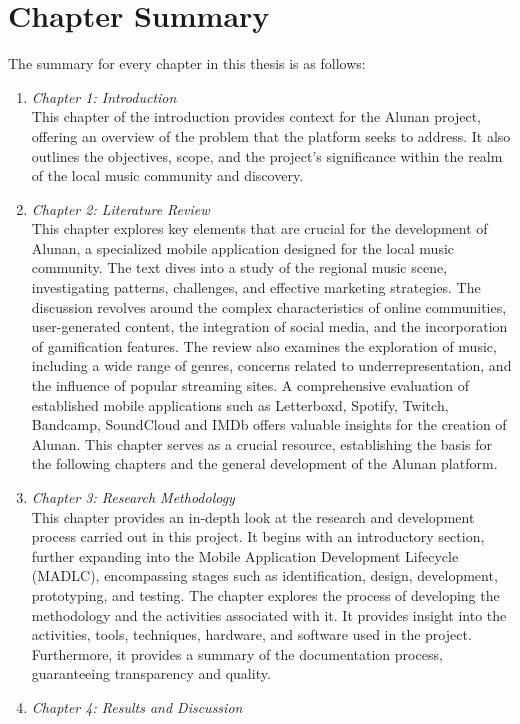 \section{Chapter Summary}
The summary for every chapter in this thesis is as follows:
\begin{enumerate}[1.]
    \item \textit{Chapter 1: Introduction} \\
    This chapter of the introduction provides context for the Alunan project, offering an overview of the problem that the platform seeks to address. It also outlines the objectives, scope, and the project's significance within the realm of the local music community and discovery.
    \item \textit{Chapter 2: Literature Review} \\
    This chapter explores key elements that are crucial for the development of Alunan, a specialized mobile application designed for the local music community. The text dives into a study of the regional music scene, investigating patterns, challenges, and effective marketing strategies. The discussion revolves around the complex characteristics of online communities, user-generated content, the integration of social media, and the incorporation of gamification features. The review also examines the exploration of music, including a wide range of genres, concerns related to underrepresentation, and the influence of popular streaming sites. A comprehensive evaluation of established mobile applications such as Letterboxd, Spotify, Twitch, Bandcamp, SoundCloud and IMDb offers valuable insights for the creation of Alunan. This chapter serves as a crucial resource, establishing the basis for the following chapters and the general development of the Alunan platform.
    \item \textit{Chapter 3: Research Methodology} \\
    This chapter provides an in-depth look at the research and development process carried out in this project. It begins with an introductory section, further expanding into the Mobile Application Development Lifecycle (MADLC), encompassing stages such as identification, design, development, prototyping, and testing. The chapter explores the process of developing the methodology and the activities associated with it. It provides insight into the activities, tools, techniques, hardware, and software used in the project. Furthermore, it provides a summary of the documentation process, guaranteeing transparency and quality.
    \item \textit{Chapter 4: Results and Discussion} \\

\end{enumerate}
